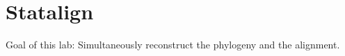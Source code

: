 \chapter{Statalign}

Goal of this lab:
Simultaneously reconstruct the phylogeny and the alignment.

